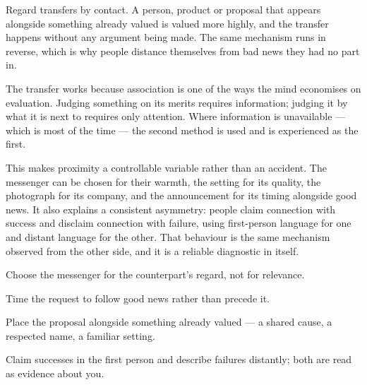


\begin{core}
Regard transfers by contact. A person, product or proposal that appears alongside something already valued is valued more highly, and the transfer happens without any argument being made. The same mechanism runs in reverse, which is why people distance themselves from bad news they had no part in.
\end{core}

\begin{mechanism}
The transfer works because association is one of the ways the mind economises on evaluation. Judging something on its merits requires information; judging it by what it is next to requires only attention. Where information is unavailable --- which is most of the time --- the second method is used and is experienced as the first.

This makes proximity a controllable variable rather than an accident. The messenger can be chosen for their warmth, the setting for its quality, the photograph for its company, and the announcement for its timing alongside good news. It also explains a consistent asymmetry: people claim connection with success and disclaim connection with failure, using first-person language for one and distant language for the other. That behaviour is the same mechanism observed from the other side, and it is a reliable diagnostic in itself.
\end{mechanism}

\begin{application}
  \item Choose the messenger for the counterpart's regard, not for relevance.
  \item Time the request to follow good news rather than precede it.
  \item Place the proposal alongside something already valued --- a shared cause, a respected name, a familiar setting.
  \item Claim successes in the first person and describe failures distantly; both are read as evidence about you.
\end{application}

